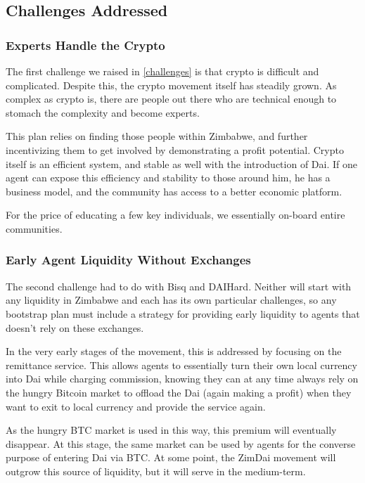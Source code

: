 \documentclass{article}
\begin{document}
\subsection{Challenges Addressed} \label{challenges addressed}

\subsubsection{Experts Handle the Crypto} \label{experts}

The first challenge we raised in \ref{challenges} is that crypto is difficult and complicated. Despite this, the crypto movement itself has steadily grown. As complex as crypto is, there are people out there who are technical enough to stomach the complexity and become experts.

This plan relies on finding those people within Zimbabwe, and further incentivizing them to get involved by demonstrating a profit potential. Crypto itself is an efficient system, and stable as well with the introduction of Dai. If one agent can expose this efficiency and stability to those around him, he has a business model, and the community has access to a better economic platform.

For the price of educating a few key individuals, we essentially on-board entire communities.

\subsubsection{Early Agent Liquidity Without Exchanges} \label{early liquidity}

The second challenge had to do with Bisq and DAIHard. Neither will start with any liquidity in Zimbabwe and each has its own particular challenges, so any bootstrap plan must include a strategy for providing early liquidity to agents that doesn't rely on these exchanges.

In the very early stages of the movement, this is addressed by focusing on the remittance service. This allows agents to essentially turn their own local currency into Dai while charging commission, knowing they can at any time always rely on the hungry Bitcoin market to offload the Dai (again making a profit) when they want to exit to local currency and provide the service again.

As the hungry BTC market is used in this way, this premium will eventually disappear. At this stage, the same market can be used by agents for the converse purpose of entering Dai via BTC. At some point, the ZimDai movement will outgrow this source of liquidity, but it will serve in the medium-term.
\end{document}
